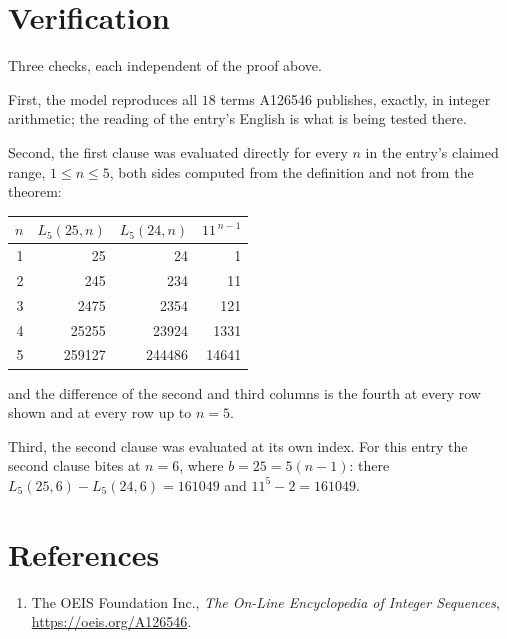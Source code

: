 \documentclass[11pt,a4paper]{article}
\theoremstyle{plain}
\theoremstyle{definition}
\begin{document}
\section{Verification}

Three checks, each independent of the proof above.

First, the model reproduces all $18$ terms A126546 publishes, exactly, in integer
arithmetic; the reading of the entry's English is what is being tested there.

Second, the first clause was evaluated directly for every $n$ in the entry's claimed range,
$1\le n\le5$, both sides computed from the definition and not from the theorem:

\begin{center}
\begin{tabular}{rrrr}
$n$ & $L_{5}(25,n)$ & $L_{5}(24,n)$ & $11^{\,n-1}$ \\ \hline
1 & 25 & 24 & 1 \\
2 & 245 & 234 & 11 \\
3 & 2475 & 2354 & 121 \\
4 & 25255 & 23924 & 1331 \\
5 & 259127 & 244486 & 14641 \\
\end{tabular}
\end{center}

\noindent and the difference of the second and third columns is the fourth at every row shown
and at every row up to $n=5$.

Third, the second clause was evaluated at its own index. For this entry the second clause bites at $n=6$, where $b=25=5(n-1)$: there $L_{5}(25,6)-L_{5}(24,6)=161049$ and $11^{5}-2=161049$.

\section*{References}
\begin{enumerate}
\item The OEIS Foundation Inc., \emph{The On-Line Encyclopedia of Integer Sequences},
\url{https://oeis.org/A126546}.
\end{enumerate}
\end{document}
